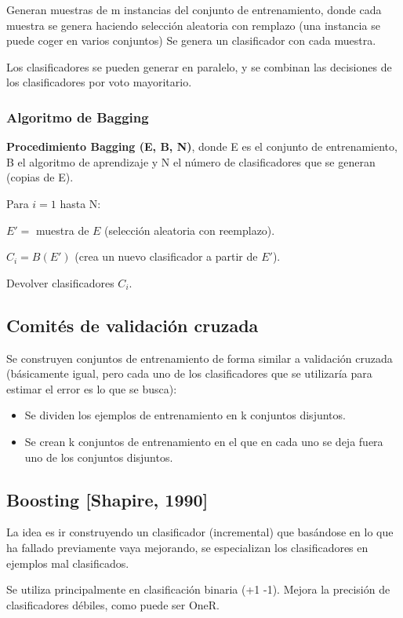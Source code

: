 \documentclass[12pt, twoside, openright]{report} %
\begin{document}
Generan muestras de m instancias del conjunto de entrenamiento, donde cada muestra se genera haciendo selección aleatoria con remplazo (una instancia se puede coger en varios conjuntos) Se genera un clasificador con cada muestra.

Los clasificadores se pueden generar en paralelo, y se combinan las decisiones de los clasificadores por voto mayoritario.	

\subsubsection{Algoritmo de Bagging}
\textbf{Procedimiento Bagging (E, B, N)}, donde E es el conjunto de entrenamiento, B el algoritmo de aprendizaje y N el número de clasificadores que se generan (copias de E).

Para $i = 1$ hasta N:

\hspace{6mm} $E' =$ muestra de $E$ (selección aleatoria con reemplazo).

\hspace{6mm} $C_i = B(E')$ (crea un nuevo clasificador a partir de $E'$).

Devolver clasificadores $C_i$.

\subsection{Comités de validación cruzada}
Se construyen conjuntos de entrenamiento de forma similar a validación cruzada (básicamente igual, pero cada uno de los clasificadores que se utilizaría para estimar el error es lo que se busca):
\begin{itemize}
	\item Se dividen los ejemplos de entrenamiento en k conjuntos disjuntos.
	\item Se crean k conjuntos de entrenamiento en el que en cada uno se deja fuera uno de los conjuntos disjuntos.
\end{itemize}

\subsection{Boosting [Shapire, 1990]}
La idea es ir construyendo un clasificador (incremental) que basándose en lo que ha fallado previamente vaya mejorando, se especializan los clasificadores en ejemplos mal clasificados.

Se utiliza principalmente en clasificación binaria (+1 -1). Mejora la precisión de clasificadores débiles, como puede ser OneR.
\end{document}
